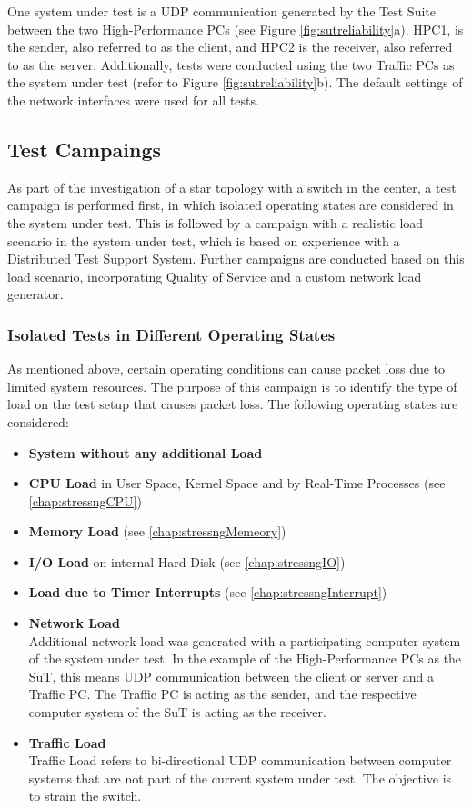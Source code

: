 One system under test is a UDP communication generated by the Test Suite between the two High-Performance PCs (see Figure \ref{fig:sutreliability}a). HPC1, is the sender, also referred to as the client, and HPC2 is the receiver, also referred to as the server. Additionally, tests were conducted using the two Traffic PCs as the system under test (refer to Figure \ref{fig:sutreliability}b). The default settings of the network interfaces were used for all tests.

\subsection{Test Campaings}
As part of the investigation of a star topology with a switch in the center, a test campaign is performed first, in which isolated operating states are considered in the system under test. This is followed by a campaign with a realistic load scenario in the system under test, which is based on experience with a Distributed Test Support System. Further campaigns are conducted based on this load scenario, incorporating Quality of Service and a custom network load generator.

\subsubsection{Isolated Tests in Different Operating States} \label{chap:relcamp1}
As mentioned above, certain operating conditions can cause packet loss due to limited system resources. The purpose of this campaign is to identify the type of load on the test setup that causes packet loss. The following operating states are considered:

\begin{itemize}
  \item \textbf{System without any additional Load}
  \item \textbf{CPU Load} in User Space, Kernel Space and by Real-Time Processes (see \ref{chap:stressngCPU})
  \item \textbf{Memory Load} (see \ref{chap:stressngMemeory})
  \item \textbf{I/O Load} on internal Hard Disk (see \ref{chap:stressngIO})
  \item \textbf{Load due to Timer Interrupts} (see \ref{chap:stressngInterrupt})
  \item \textbf{Network Load} \\
  		Additional network load was generated with a participating computer system of the system under test. In the example of the High-Performance PCs as the SuT, this means UDP communication between the client or server and a Traffic PC. The Traffic PC is acting as the sender, and the respective computer system of the SuT is acting as the receiver.
  		
  \item \textbf{Traffic Load} \\
 		Traffic Load refers to bi-directional UDP communication between computer systems that are not part of the current system under test. The objective is to strain the switch.
\end{itemize}

